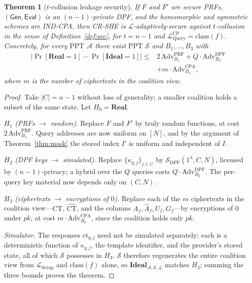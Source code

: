\documentclass[journal]{IEEEtran}
\newtheorem{theorem}{Theorem}
\newcommand{\PPT}{\mathrm{PPT}}
\newcommand{\Real}{\mathbf{Real}}
\newcommand{\Ideal}{\mathbf{Ideal}}
\newcommand{\Leak}{\mathcal{L}}
\newcommand{\Sim}{\mathcal{S}}
\newcommand{\Adv}{\mathcal{A}}
\newcommand{\Gen}{\mathsf{Gen}}
\newcommand{\Eval}{\mathsf{Eval}}
\begin{document}
\begin{theorem}[$t$-collusion leakage security]
\label{thm:sec}
If $F$ and $F'$ are secure PRFs, $(\Gen,\Eval)$ is an $(n{-}1)$-private DPF, and the homomorphic and symmetric schemes are IND-CPA, then CR-SHE is $\Leak$-adaptively-secure against $t$-collusion in the sense of Definition~\ref{def:sec}, for $t=n-1$ and $\Leak^{\text{CP}}_{\mathrm{Query}}=\mathrm{class}(f)$. Concretely, for every $\PPT$ $\Adv$ there exist $\PPT$ $\Sim$ and $B_1,\dots,B_3$ with
\begin{align*}
\big|\Pr[\Real{=}1]-\Pr[\Ideal{=}1]\big| \le{} & 2\,\mathrm{Adv}^{\mathrm{PRF}}_{B_1} + Q\cdot\mathrm{Adv}^{\mathrm{DPF}}_{B_2} \\
& + m\cdot\mathrm{Adv}^{\mathrm{CPA}}_{B_3},
\end{align*}
where $m$ is the number of ciphertexts in the coalition view.
\end{theorem}
\begin{proof}
Take $|C|=n-1$ without loss of generality; a smaller coalition holds a subset of the same state. Let $H_0=\Real$.

\emph{$H_1$ (PRFs $\to$ random).} Replace $F$ and $F'$ by truly random functions, at cost $2\,\mathrm{Adv}^{\mathrm{PRF}}_{B_1}$. Query addresses are now uniform on $[N]$, and by the argument of Theorem~\ref{thm:mask} the stored index $I'$ is uniform and independent of $I$.

\emph{$H_2$ (DPF keys $\to$ simulated).} Replace $\{\kappa_{q,j}\}_{j\in C}$ by $\Sim_{\mathrm{DPF}}(1^\lambda,C,N)$, licensed by $(n{-}1)$-privacy; a hybrid over the $Q$ queries costs $Q\cdot\mathrm{Adv}^{\mathrm{DPF}}_{B_2}$. The per-query key material now depends only on $(C,N)$.

\emph{$H_3$ (ciphertexts $\to$ encryptions of $0$).} Replace each of the $m$ ciphertexts in the coalition view---$\text{CT}$, $\widehat{\text{CT}}$, and the columns $A_f,\widehat A_f,U_f,G_f$---by encryptions of $0$ under $pk$, at cost $m\cdot\mathrm{Adv}^{\mathrm{CPA}}_{B_3}$, since the coalition holds only $pk$.

\emph{Simulator.} The responses $\text{ct}_{q,j}$ need not be simulated separately: each is a deterministic function of $\kappa_{q,j}$, the template identifier, and the provider's stored state, all of which $\Sim$ possesses in $H_3$. $\Sim$ therefore regenerates the entire coalition view from $\Leak_{\mathrm{Setup}}$ and $\mathrm{class}(f)$ alone, so $\Ideal_{\Adv,\Sim,\Leak}$ matches $H_3$; summing the three bounds proves the theorem.
\end{proof}
\end{document}
